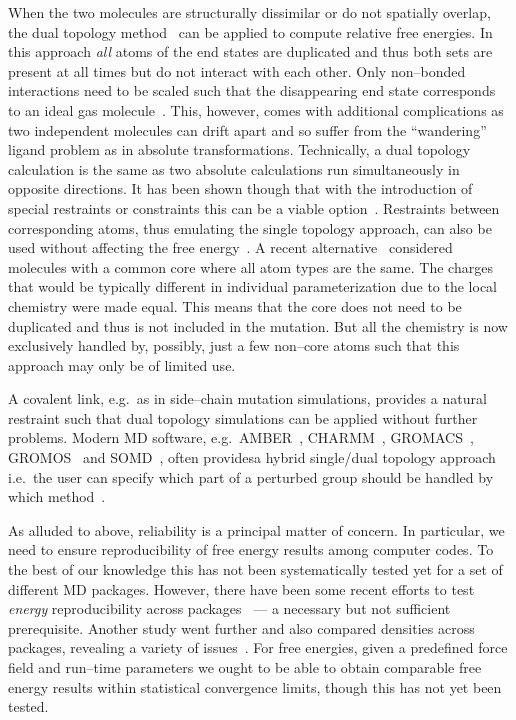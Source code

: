\documentclass[journal=jctcce,manuscript=article]{achemso}
\begin{document}
When the two molecules are structurally dissimilar or do not spatially overlap, 
the dual topology method~\cite{doi:10.1021/j100056a020, doi:10.1021/jp981628n} 
can be applied to compute relative free energies.  In this approach \emph{all} 
atoms of the end states are duplicated and thus both sets are present at all
times but do not interact with each other.  Only non--bonded
interactions need to be scaled such that the disappearing end state
corresponds to an ideal gas molecule~\cite{doi:10.1021/jp981628n}.
This, however, comes with additional complications as two independent
molecules can drift apart and so suffer from the ``wandering'' ligand
problem as in absolute transformations\cite{GILSON19971047,
doi:10.1021/jp0217839, deng_computations_2009}.  Technically, a dual topology 
calculation is the same as two absolute calculations run simultaneously in 
opposite directions.  It has been shown though that with the introduction of 
special restraints or constraints this can be a viable 
option~\cite{doi:10.1021/ct700081t,  rocklin_separated_2013, JCC:Axelsen-Li}.  
Restraints between corresponding atoms, thus emulating the single topology 
approach, can also be used without affecting the free 
energy~\cite{JCC:Axelsen-Li}.  A recent 
alternative~\cite{doi:10.1021/acs.jctc.5b00179} considered molecules with a
common core where all atom types are the same.  The charges that would be 
typically different in individual parameterization due to the local chemistry
were made equal.  This means that the core does not need to be duplicated and 
thus is not included in the mutation.  But all the chemistry is now exclusively 
handled by, possibly, just a few non--core atoms such that this approach may 
only be of limited use.

A covalent link, e.g.\ as in side--chain mutation simulations, provides a 
natural restraint such that dual topology simulations can be applied without 
further problems.  Modern MD software, e.g.\ AMBER~\cite{case_amber_2005},
CHARMM~\cite{JCC:JCC21287}, GROMACS~\cite{Abraham201519},
GROMOS~\cite{doi:10.1021/jp984217f} and SOMD~\cite{Sire-2016,
  doi:10.1021/ct300857j}, often providesa hybrid single/dual topology approach
i.e.\ the user can specify which part of a perturbed group should be handled by 
which method~\cite{doi:10.1021/jp994193s}.

As alluded to above, reliability is a principal matter of concern.  In
particular, we need to ensure reproducibility of free energy results
among computer codes.  To the best of our knowledge this has not been
systematically tested yet for a set of different MD packages. 
However, there have been some recent efforts to test \emph{energy} 
reproducibility across packages~\cite{Shirts2017} --- a necessary but not 
sufficient prerequisite.  Another study went further and also compared 
densities across packages, revealing a variety of 
issues~\cite{doi:10.1021/acs.jctc.7b00489}.
For free energies, given a predefined force field and run--time parameters we 
ought to be able to obtain comparable free energy results within statistical 
convergence limits, though this has not yet been tested.
\end{document}
